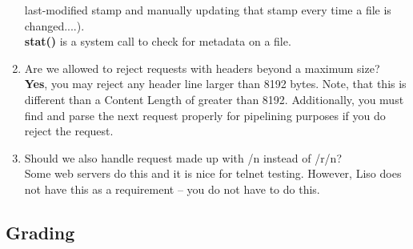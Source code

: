 \begin{enumerate}
     last-modified stamp and manually updating that stamp every time a file is
     changed....).\\
    \textbf{stat()} is a system call to check for metadata on a file. 
    \item Are we allowed to reject requests with headers beyond a maximum size?\\
    \textbf{Yes}, you may reject any header line larger than 8192 bytes. Note, that this is different than a Content Length of greater than 8192. Additionally, you must find and parse the next request properly for pipelining purposes if you do reject the request.
    \item Should we also handle request made up with /n instead of /r/n?\\
    Some web servers do this and it is nice for telnet testing. However, Liso does not have this as a requirement -- you do not have to do this.
\end{enumerate}

\subsection{Grading}

